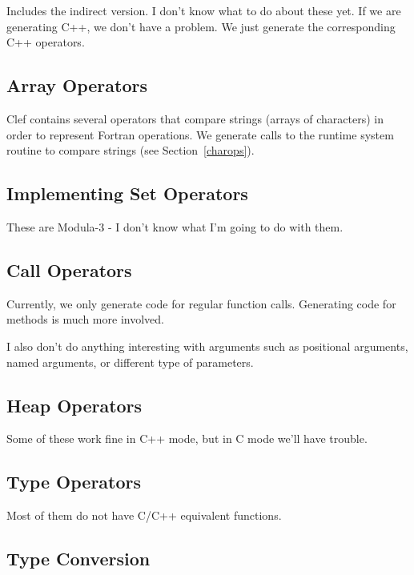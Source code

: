 Includes the indirect version.  I don't know what to do 
about these yet.  If we are generating C++, we don't have
a problem.  We just generate the corresponding C++ operators.

\subsection{Array Operators}

Clef contains several operators that compare strings (arrays of
characters) in order to represent Fortran  operations.
We generate calls to the runtime system routine  to
compare strings (see Section~\ref{charops}).


\subsection{Implementing Set Operators}
 
These are Modula-3 - I don't know what I'm going to
do with them.

\subsection{Call Operators}

Currently, we only generate code for regular function calls.  Generating
code for methods is much more involved.

I also don't do anything interesting with arguments such 
as positional arguments, named arguments, or different type
of parameters.

\subsection{Heap Operators}

Some of these work fine in C++ mode, but in C mode
we'll have trouble.

\subsection{Type Operators}

Most of them do not have C/C++ equivalent functions.

\subsection{Type Conversion}

